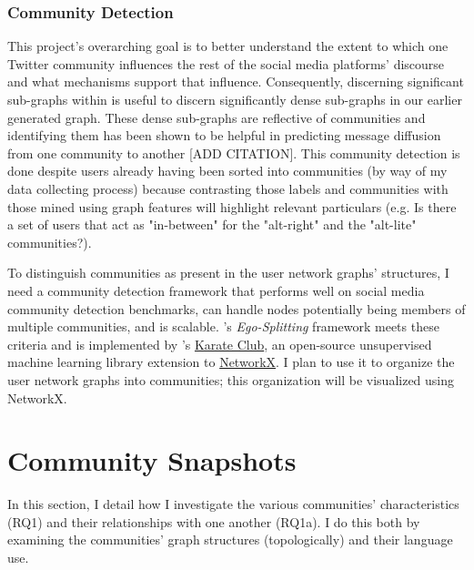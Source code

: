 \documentclass[acmlarge, screen, authorversion]{acmart}
\begin{document}

    
    \subsubsection{Community Detection}
    
   This project's overarching goal is to better understand the extent to which one Twitter community influences the rest of the social media platforms' discourse and what mechanisms support that influence. Consequently, discerning significant sub-graphs within is useful to discern significantly dense sub-graphs in our earlier generated graph. These dense sub-graphs are reflective of communities and identifying them has been shown to be helpful in predicting message diffusion from one community to another [ADD CITATION]. This community detection is done despite users already having been sorted into communities (by way of my data collecting process) because contrasting those labels and communities with those mined using graph features will highlight relevant particulars (e.g. Is there a set of users that act as "in-between" for the "alt-right" and the "alt-lite" communities?).
   
   To distinguish communities as present in the user network graphs' structures, I need a community detection framework that performs well on social media community detection benchmarks, can handle nodes potentially being members of multiple communities, and is scalable. \citet{epastoEgoSplittingFrameworkNonOverlapping2017}'s \textit{Ego-Splitting} framework meets these criteria and is implemented by \citet{rozemberczkiAPIOrientedOpensource2020}'s \href{https://github.com/benedekrozemberczki/karateclub}{Karate Club}, an open-source unsupervised machine learning library extension to \href{https://networkx.github.io/}{NetworkX}. I plan to use it to organize the user network graphs into communities; this organization will be visualized using NetworkX.

\section{Community Snapshots}

In this section, I detail how I investigate the various communities' characteristics (RQ1) and their relationships with one another (RQ1a). I do this both by examining the communities' graph structures (topologically) and their language use.
\end{document}
